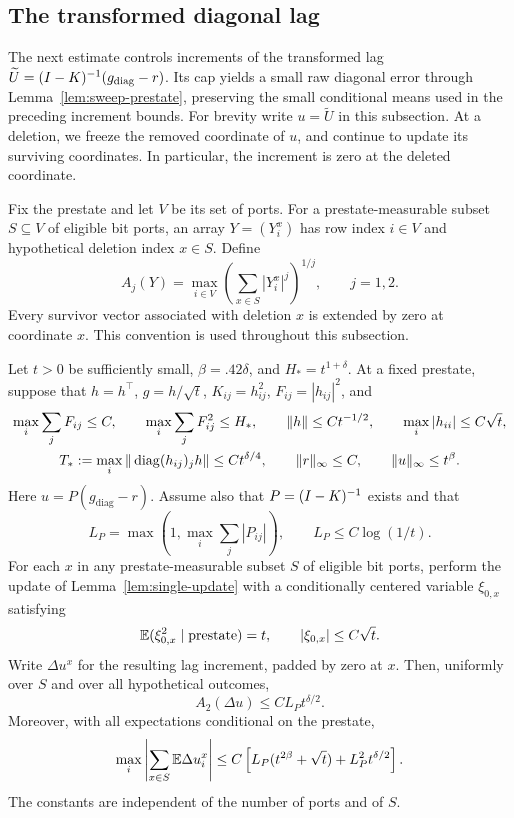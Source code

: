 \subsection{The transformed diagonal lag}

The next estimate controls increments of the transformed lag
\(\widetilde U=(I-K)^{-1}(g_{\rm diag}-r)\). Its cap yields a small
raw diagonal error through Lemma~\ref{lem:sweep-prestate}, preserving the
small conditional means used in the preceding increment bounds. For brevity
write \(u=\widetilde U\) in this subsection.
At a deletion, we freeze the removed coordinate of \(u\), and continue to
update its surviving coordinates.  In particular, the increment is zero
at the deleted coordinate.

Fix the prestate and let \(V\) be its set of ports.  For a prestate-measurable subset
\(S\subseteq V\) of eligible bit ports, an array \(Y=(Y_i^x)\) has row
index \(i\in V\) and hypothetical deletion index \(x\in S\).  Define
\[
 A_j(Y)=\max_{i\in V}
       \left(\sum_{x\in S}|Y_i^x|^j\right)^{1/j},
 \qquad j=1,2.
\]
Every survivor vector associated with deletion \(x\) is extended by zero
at coordinate \(x\).  This convention is used throughout this subsection.

\begin{lemma}\label{lem:sweep-lag}
Let \(t>0\) be sufficiently small, \(\beta=.42\delta\), and
\(H_*=t^{1+\delta}\).  At a fixed prestate, suppose that \(h=h^\top\),
\(g=h/\sqrt t\), \(K_{ij}=h_{ij}^2\), \(F_{ij}=|h_{ij}|^2\), and
\begin{equation}\label{eq:sweep-lag-prestate}
\begin{gathered}
 \max_i\sum_jF_{ij}\le C,\qquad
 \max_i\sum_jF_{ij}^2\le H_*,\qquad
 \|h\|\le Ct^{-1/2},\qquad
 \max_i|h_{ii}|\le C\sqrt t,\\
 T_*:=\max_i\|\operatorname{diag}(h_{ij})_j h\|\le Ct^{\delta/4},\qquad
 \|r\|_\infty\le C,\qquad \|u\|_\infty\le t^\beta.
\end{gathered}
\end{equation}
Here \(u=P(g_{\mathrm{diag}}-r)\). Assume also that
\(P=(I-K)^{-1}\) exists and that
\[
 L_P=\max\left(1,\max_i\sum_j|P_{ij}|\right),
 \qquad L_P\le C\log(1/t).
\]
For each \(x\) in any prestate-measurable subset \(S\) of eligible bit
ports, perform the
update of Lemma~\ref{lem:single-update} with a conditionally centered
variable \(\xi_{0,x}\) satisfying
\[
 \mathbb E(\xi_{0,x}^2\mid\mathrm{prestate})=t,
 \qquad |\xi_{0,x}|\le C\sqrt t.
\]
Write \(\Delta u^x\) for the resulting lag increment, padded by zero at
\(x\).  Then, uniformly over \(S\) and over all hypothetical outcomes,
\[
 A_2(\Delta u)\le CL_Pt^{\delta/2}.
\]
Moreover, with all expectations conditional on the prestate,
\[
 \max_i\left|\sum_{x\in S}\mathbb E\Delta u_i^x\right|
 \le C\left[L_P(t^{2\beta}+\sqrt t)+L_P^2t^{\delta/2}\right].
\]
The constants are independent of the number of ports and of \(S\).
\end{lemma}

